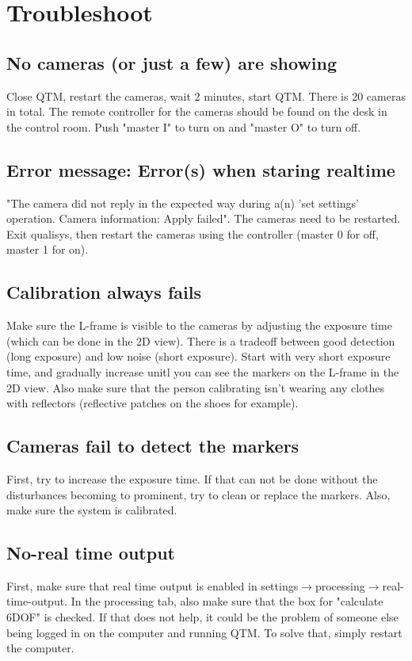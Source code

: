 \documentclass{article}
\begin{document}
\section{Troubleshoot}
\subsection{No cameras (or just a few) are showing}
\label{lost_cameras}
Close QTM, restart the cameras, wait 2 minutes, start QTM. There is 20 cameras in total. The remote controller for the cameras should be found on the desk in the control room. Push "master I" to turn on and "master O" to turn off.
\subsection{Error message: Error(s) when staring realtime}
"The camera did not reply in the expected way during a(n) 'set settings' operation. Camera information: Apply failed". The cameras need to be restarted. Exit qualisys, then restart the cameras using the controller (master 0 for off, master 1 for on).
\subsection{Calibration always fails}
Make sure the L-frame is visible to the cameras by adjusting the exposure time (which can be done in the 2D view). There is a tradeoff between good detection (long exposure) and low noise (short exposure). Start with very short exposure time, and gradually increase unitl you can see the markers on the L-frame in the 2D view. Also make sure that the person calibrating isn't wearing any clothes with reflectors (reflective patches on the shoes for example).
\subsection{Cameras fail to detect the markers}
First, try to increase the exposure time. If that can not be done without the disturbances becoming to prominent, try to clean or replace the markers. Also, make sure the system is calibrated.
\subsection{No-real time output}
First, make sure that real time output is enabled in settings$\rightarrow$processing$\rightarrow$real-time-output. In the processing tab, also make sure that the box for "calculate 6DOF" is checked. If that does not help, it could be the problem of someone else being logged in on the computer and running QTM. To solve that, simply restart the computer.
\end{document}
